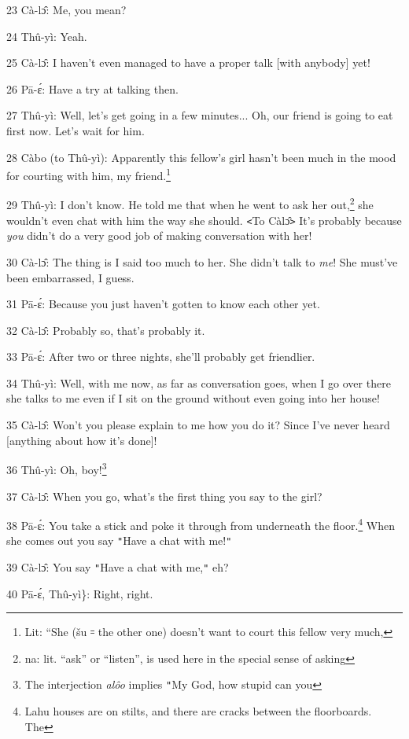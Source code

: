23 Cà-lɔ̂: Me, you mean?

24 Thû-yì: Yeah.

25 Cà-lɔ̂: I haven't even managed to have a proper talk [with anybody] yet!

26 Pā-ɛ́: Have a try at talking then.

27 Thû-yì: Well, let's get going in a few minutes... Oh, our friend is going
to eat first now. Let's wait for him.

28  Càbo (to Thû-yì): Apparently this fellow's girl hasn't been much in the
mood for courting with him, my friend.\footnote{Lit: ``She (šu ꞊ the other one) doesn't want to court this fellow very much,}

29 Thû-yì: I don't know. He told me that when he went to ask her out,\footnote{na: lit. ``ask'' or ``listen'', is used here in the special sense of asking} she
wouldn't even chat with him the way she should. \texttt{<}To Càlɔ̂\texttt{>}
It's probably because \textit{you} didn't do a very good job of making conversation
with her!

30 Cà-lɔ̂: The thing is I said too much to her. She didn't talk to\textit{ me}!
She must've been embarrassed, I guess.

31 Pā-ɛ́: Because you just haven't gotten to know each other yet.

32 Cà-lɔ̂: Probably so, that's probably it.

33 Pā-ɛ́: After two or three nights, she'll probably get friendlier.

34 Thû-yì: Well, with me now, as far as conversation goes, when I go over there
she talks to me even if I sit on the ground without even going into her house!

35 Cà-lɔ̂: Won't you please explain to me how you do it? Since I've never heard
[anything about how it's done]!

36 Thû-yì: Oh, boy!\footnote{The interjection \textit{alôo} implies \texttt{"}My God, how stupid can you}

37 Cà-lɔ̂: When you go, what's the first thing you say to the girl?

38 Pā-ɛ́: You take a stick and poke it through from underneath the floor.\footnote{Lahu houses are on stilts, and there are cracks between the floorboards. The}
When she comes out you say \texttt{"}Have a chat with me!\texttt{"}

39 Cà-lɔ̂: You say \texttt{"}Have a chat with me,\texttt{"} eh?

40 Pā-ɛ́, Thû-yì\}: Right, right.

